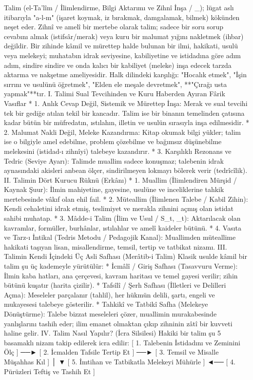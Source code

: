 \documentclass[11pt,a4paper]{article}
\begin{document}
Talim (el-Ta'lîm / İlimlendirme, Bilgi Aktarımı ve Zihnî İnşa / _{}); lügat aslı itibarıyla "a-l-m" (işaret koymak, iz bırakmak, damgalamak, bilmek) kökünden neşet eder.
Zihnî ve amelî bir mertebe olarak talim; sadece bir soru sorup cevabını almak (istifsâr/merak) veya kuru bir malumat yığını nakletmek (ihbar) değildir. Bir zihinde kâmil ve mürettep halde bulunan bir ilmi, hakikati, usulü veya melekeyi; muhatabın idrak seviyesine, kabiliyetine ve istidadına göre adım adım, sindire sindire ve onda kalıcı bir kabiliyet (meleke) inşa edecek tarzda aktarma ve nakşetme ameliyesidir.
Halk dilindeki karşılığı: "Hocalık etmek", "İşin sırrını ve usulünü öğretmek", "Elden ele meşale devretmek", **"Çırağı usta yapmak"**tır.
I. Talimi Sual Tevcihinden ve Kuru Haberden Ayıran Fârik Vasıflar
 * 1. Anlık Cevap Değil, Sistemik ve Mürettep İnşa:
   Merak ve sual tevcihi tek bir gediğe atılan tekil bir kancadır. Talim ise bir binanın temelinden çatısına kadar bütün bir müfredatın, ıstılahın, illetin ve usulün sırasıyla inşa edilmesidir.
 * 2. Malumat Nakli Değil, Meleke Kazandırma:
   Kitap okumak bilgi yükler; talim ise o bilgiyle amel edebilme, problem çözebilme ve bağımsız düşünebilme melekesini (istidad-ı zihnîyi) talebeye kazandırır.
 * 3. Karşılıklı Rezonans ve Tedric (Seviye Ayarı):
   Talimde muallim sadece konuşmaz; talebenin idrak aynasındaki akisleri anbean ölçer, sindirilmeyen lokmayı bölerek verir (tedrîcîlik).
II. Talimin Dört Kurucu Rüknü (Erkânı)
 * 1. Muallim (İlimlendiren Mürşid / Kaynak Şuur): İlmin mahiyetine, gayesine, usulüne ve inceliklerine tahkik mertebesinde vâkıf olan ehil fail.
 * 2. Müteallim (İlimlenen Talebe / Kabil Zihin): Kendi cehaletini idrak etmiş, teslimiyet ve merakla zihnini açmış olan istidat sahibi muhatap.
 * 3. Mâdde-i Talim (İlim ve Usul / S_t, _t): Aktarılacak olan kavramlar, formüller, burhânlar, ıstılahlar ve amelî kaideler bütünü.
 * 4. Vasıta ve Tarz-ı İntikal (Tedris Metodu / Pedagojik Kanal): Muallimden müteallime hakikati taşıyan lisan, misallendirme, temsil, tertip ve tatbikat nizamı.
III. Talimin Kendi İçindeki Üç Asli Safhası (Merâtib-i Talim)
Klasik usulde kâmil bir talim şu üç kademeyle yürütülür:
 * İcmâlî / Giriş Safhası (Tasavvuru Verme):
   İlmin kaba hatları, ana çerçevesi, kavram haritası ve temel gayesi verilir; zihin bütünü kuşatır (harita çizilir).
 * Tafsîlî / Şerh Safhası (İlletleri ve Delilleri Açma):
   Meseleler parçalanır (tahlil), her hükmün delili, şartı, engeli ve mukayesesi talebeye gösterilir.
 * Tahkikî ve Tatbikî Safha (Melekeye Dönüştürme):
   Talebe bizzat meseleleri çözer, muallimin murakabesinde yanlışlarını tashih eder; ilim emanet olmaktan çıkıp zihninin zâtî bir kuvveti haline gelir.
IV. Talim Nasıl Yapılır? (İcra Silsilesi)
Hakiki bir talim şu 5 basamaklı nizam takip edilerek icra edilir:
[ 1. Talebenin İstidadını ve Zeminini Ölç ] ──► [ 2. İcmalden Tafsile Tertip Et ] ──► [ 3. Temsil ve Misalle Müşahhas Kıl ]
                                                                                               │
                                                                                               ▼
[ 5. İmtihan ve Tatbikatla Melekeyi Mühürle ] ◄── [ 4. Pürüzleri Teftiş ve Tashih Et ]
\end{document}
